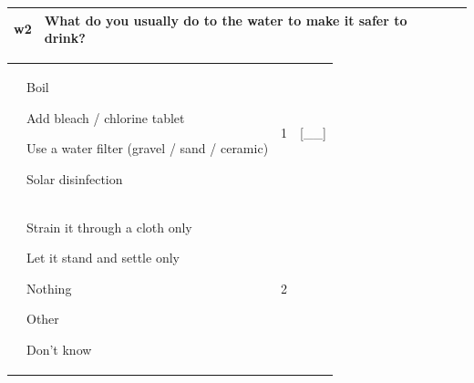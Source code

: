\documentclass[12pt,a4paper]{book}
\theoremstyle{definition}
\theoremstyle{definition}
\theoremstyle{definition}
\theoremstyle{remark}
\begin{document}
\begin{longtable}[]{@{}llll@{}}
\toprule
\begin{minipage}[t]{0.09\columnwidth}\raggedright
w2\strut
\end{minipage} & \begin{minipage}[t]{0.41\columnwidth}\raggedright
What do you usually do to the water to make it safer to drink?\strut
\end{minipage} & \begin{minipage}[t]{0.25\columnwidth}\raggedright
\strut
\end{minipage} & \begin{minipage}[t]{0.13\columnwidth}\raggedright
\strut
\end{minipage}\tabularnewline
\bottomrule
\end{longtable}

\begin{longtable}[]{@{}llll@{}}
\toprule
\begin{minipage}[t]{0.24\columnwidth}\raggedright
\strut
\end{minipage} & \begin{minipage}[t]{0.24\columnwidth}\raggedright
Boil

Add bleach / chlorine tablet

Use a water filter (gravel / sand / ceramic)

Solar disinfection\strut
\end{minipage} & \begin{minipage}[t]{0.24\columnwidth}\raggedright
1\strut
\end{minipage} & \begin{minipage}[t]{0.24\columnwidth}\raggedright
{[}\_\_{]}\strut
\end{minipage}\tabularnewline
\begin{minipage}[t]{0.24\columnwidth}\raggedright
\strut
\end{minipage} & \begin{minipage}[t]{0.24\columnwidth}\raggedright
Strain it through a cloth only

Let it stand and settle only

Nothing

Other

Don't know\strut
\end{minipage} & \begin{minipage}[t]{0.24\columnwidth}\raggedright
2\strut
\end{minipage} & \begin{minipage}[t]{0.24\columnwidth}\raggedright
\strut
\end{minipage}\tabularnewline
\bottomrule
\end{longtable}
\end{document}

